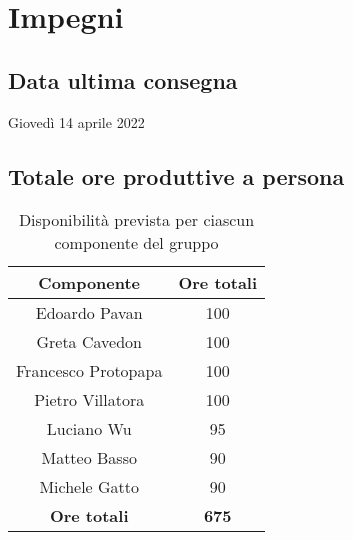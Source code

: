 \section{Impegni}
\subsection{Data ultima consegna}
Giovedì 14 aprile 2022
\subsection{Totale ore produttive a persona}
\begin{center}
\begin{table}[!htbp]
	\centering
    \begin{tabular}{c|c}
	\toprule
    \textbf{Componente} & \textbf{Ore totali} \\
    \midrule
    \rowcolor{gray!10} Edoardo Pavan & 100 \\ 
    \hline
    Greta Cavedon & 100 \\ 
    \hline
    \rowcolor{gray!10} Francesco Protopapa &  100 \\
    \hline
    Pietro Villatora &  100 \\
    \hline
    \rowcolor{gray!10}  Luciano Wu & 95\\
    \hline
    Matteo Basso &  90\\
    \hline
    \rowcolor{gray!10}  Michele Gatto & 90\\
    \hline \hline
    \textbf{Ore totali} & \textbf{675}  \\
    \bottomrule
    
    \end{tabular}
    \caption{Disponibilità  prevista per ciascun componente del gruppo}
\end{table}
\end{center}

